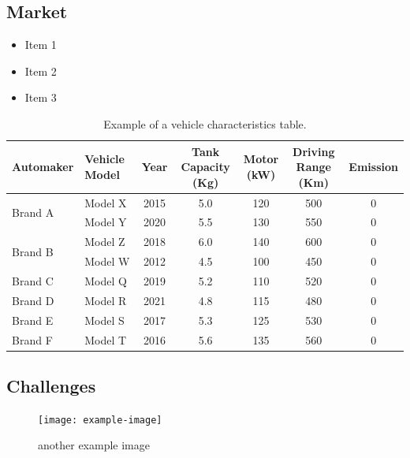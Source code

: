 	\subsection{Market}
	\lipsum[1] 
   
	\begin{itemize}
		\item Item 1
		\item Item 2
		\item Item 3
	\end{itemize}

	
\begin{table}[h!]
	\centering
	\caption{Example of a vehicle characteristics table.}
	\small
	\renewcommand{\arraystretch}{1.3} %
	\setlength{\tabcolsep}{8pt}       %
	\begin{tabular}{|l|l|c|c|c|c|c|}
		\hline
		\textbf{Automaker} & \textbf{Vehicle Model} & \textbf{Year} & 
		\makecell{\textbf{Tank Capacity} \\ \textbf{(Kg)}} &  
		\makecell{\textbf{Motor} \\ \textbf{(kW)}} & 
		\makecell{\textbf{Driving Range} \\ \textbf{(Km)}} & 
		\textbf{Emission} \\ 
		\hline
		\multirow{2}{*}{Brand A} & Model X & 2015 & 5.0 & 120 & 500 & 0 \\ \cline{2-7}
		& Model Y & 2020 & 5.5 & 130 & 550 & 0 \\ \hline
		\multirow{2}{*}{Brand B} & Model Z & 2018 & 6.0 & 140 & 600 & 0 \\ \cline{2-7}
		& Model W & 2012 & 4.5 & 100 & 450 & 0 \\ \hline
		Brand C & Model Q & 2019 & 5.2 & 110 & 520 & 0 \\ \hline
		Brand D & Model R & 2021 & 4.8 & 115 & 480 & 0 \\ \hline
		Brand E & Model S & 2017 & 5.3 & 125 & 530 & 0 \\ \hline
		Brand F & Model T & 2016 & 5.6 & 135 & 560 & 0 \\ \hline
	\end{tabular}
	\label{tab:example_vehicle_table}
\end{table}

	\subsection{Challenges  } 
	\lipsum[1] 

	
	
		\begin{figure}[h!]
		\centering
		\texttt{[image: example-image]}
		\caption{another example image}
		\label{fig1.2:just-ecample}
		
	\end{figure}
	


